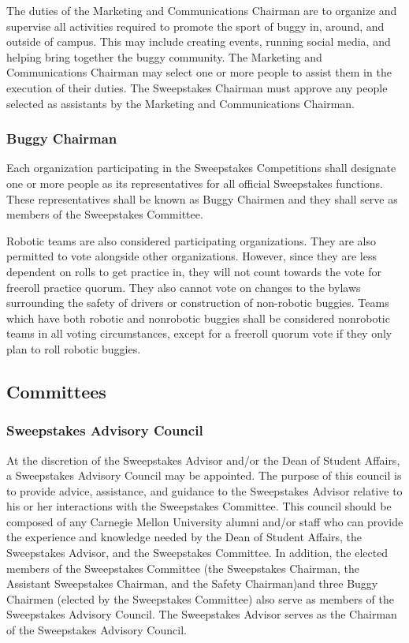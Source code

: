 	The duties of the Marketing and Communications Chairman are to organize and supervise all activities required to promote the sport of buggy in, around, and outside of campus. This may include creating events, running social media, and helping bring together the buggy community. The Marketing and Communications Chairman may select one or more people to assist them in the execution of their duties. The Sweepstakes Chairman must approve any people selected as assistants by the Marketing and Communications Chairman. 

\subsubsection{Buggy Chairman}

	Each organization participating in the Sweepstakes Competitions shall designate one or more people as its representatives for all official Sweepstakes functions. These representatives shall be known as Buggy Chairmen and they shall serve as members of the Sweepstakes Committee.

	Robotic teams are also considered participating organizations. They are also permitted to vote alongside other organizations. However, since they are less dependent on rolls to get practice in, they will not count towards the vote for freeroll practice quorum. They also cannot vote on changes to the bylaws surrounding the safety of drivers or construction of non-robotic buggies. Teams which have both robotic and nonrobotic buggies shall be considered nonrobotic teams in all voting circumstances, except for a freeroll quorum vote if they only plan to roll robotic buggies. 

\subsection{Committees}

\subsubsection{Sweepstakes Advisory Council}

	At the discretion of the Sweepstakes Advisor and/or the Dean of Student Affairs, a Sweepstakes Advisory Council may be appointed. The purpose of this council is to provide advice, assistance, and guidance to the Sweepstakes Advisor relative to his or her interactions with the Sweepstakes Committee. This council should be composed of any Carnegie Mellon University alumni and/or staff who can provide the experience and knowledge needed by the Dean of Student Affairs, the Sweepstakes Advisor, and the Sweepstakes Committee. In addition, the elected members of the Sweepstakes Committee (the Sweepstakes Chairman, the Assistant Sweepstakes Chairman, and the Safety Chairman)and three Buggy Chairmen (elected by the Sweepstakes Committee) also serve as members of the Sweepstakes Advisory Council. The Sweepstakes Advisor serves as the Chairman of the Sweepstakes Advisory Council.

